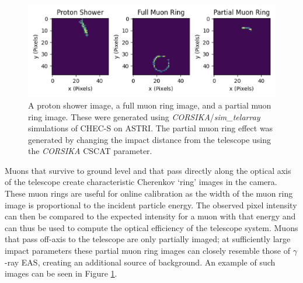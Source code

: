 \begin{figure}[h!]
\begin{center}  

\includegraphics[width=\columnwidth]{figures/muonplot.png}
 
\caption{A proton shower image, a full muon ring image, and a partial muon ring image. These were generated using \textit{CORSIKA}/\textit{sim\_telarray} simulations of CHEC-S on ASTRI. The partial muon ring effect was generated by changing the impact distance from the telescope using the \textit{CORSIKA} CSCAT parameter.}
\label{fig:muonplot}
\end{center}
\end{figure}

Muons that survive to ground level and that pass directly along the optical axis of the telescope create characteristic Cherenkov `ring' images in the camera. These muon rings are useful for online calibration as the width of the muon ring image is proportional to the incident particle energy. The observed pixel intensity can then be compared to the expected intensity for a muon with that energy and can thus be used to compute the optical efficiency of the telescope system. Muons that pass off-axis to the telescope are only partially imaged; at sufficiently large impact parameters these partial muon ring images can closely resemble those of $\gamma$-ray EAS, creating an additional source of background. An example of such images can be seen in Figure \ref{fig:muonplot}.

